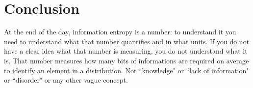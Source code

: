 \documentclass[aps,pra,10pt,floatfix,nofootinbib]{revtex4-1}
\theoremstyle{definition}
\begin{document}
\section{Conclusion}

At the end of the day, information entropy is a number: to understand it you need to understand what that number quantifies and in what units. If you do not have a clear idea what that number is measuring, you do not understand what it is. That number measures how many bits of informations are required on average to identify an element in a distribution. Not ``knowledge" or ``lack of information" or ``disorder" or any other vague concept. 
\end{document}
